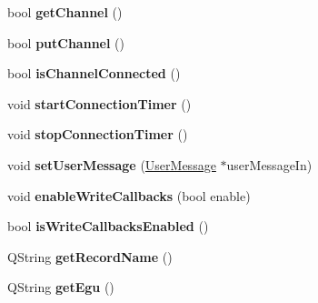 \begin{DoxyCompactItemize}
\item 
\hypertarget{classqcaobject_1_1QCaObject_ac45694857a969ad5b3398930d2cfcef6}{
bool {\bfseries getChannel} ()}
\label{classqcaobject_1_1QCaObject_ac45694857a969ad5b3398930d2cfcef6}

\item 
\hypertarget{classqcaobject_1_1QCaObject_a0612d2d036276b1519b911cf894b3160}{
bool {\bfseries putChannel} ()}
\label{classqcaobject_1_1QCaObject_a0612d2d036276b1519b911cf894b3160}

\item 
\hypertarget{classqcaobject_1_1QCaObject_a558db29ea398bd13f8f5a42265cb9f48}{
bool {\bfseries isChannelConnected} ()}
\label{classqcaobject_1_1QCaObject_a558db29ea398bd13f8f5a42265cb9f48}

\item 
\hypertarget{classqcaobject_1_1QCaObject_ab425e2c379a1896965e824c44303dc91}{
void {\bfseries startConnectionTimer} ()}
\label{classqcaobject_1_1QCaObject_ab425e2c379a1896965e824c44303dc91}

\item 
\hypertarget{classqcaobject_1_1QCaObject_a0c7930aff1f82307fa2b2b3463c8fa99}{
void {\bfseries stopConnectionTimer} ()}
\label{classqcaobject_1_1QCaObject_a0c7930aff1f82307fa2b2b3463c8fa99}

\item 
\hypertarget{classqcaobject_1_1QCaObject_a141f80673eac556ca07fe6272fc4ff33}{
void {\bfseries setUserMessage} (\hyperlink{classUserMessage}{UserMessage} $\ast$userMessageIn)}
\label{classqcaobject_1_1QCaObject_a141f80673eac556ca07fe6272fc4ff33}

\item 
\hypertarget{classqcaobject_1_1QCaObject_ab6f133d5bb5abe262e6b2b815a7a4427}{
void {\bfseries enableWriteCallbacks} (bool enable)}
\label{classqcaobject_1_1QCaObject_ab6f133d5bb5abe262e6b2b815a7a4427}

\item 
\hypertarget{classqcaobject_1_1QCaObject_a368a588e550c874b5d941bf4c1600064}{
bool {\bfseries isWriteCallbacksEnabled} ()}
\label{classqcaobject_1_1QCaObject_a368a588e550c874b5d941bf4c1600064}

\item 
\hypertarget{classqcaobject_1_1QCaObject_aeb075f3dd9d72cb0257d93cdbb9b49f4}{
QString {\bfseries getRecordName} ()}
\label{classqcaobject_1_1QCaObject_aeb075f3dd9d72cb0257d93cdbb9b49f4}

\item 
\hypertarget{classqcaobject_1_1QCaObject_aa58b753cfa9a17fea63f93fed7ca895b}{
QString {\bfseries getEgu} ()}
\label{classqcaobject_1_1QCaObject_aa58b753cfa9a17fea63f93fed7ca895b}


\end{DoxyCompactItemize}
